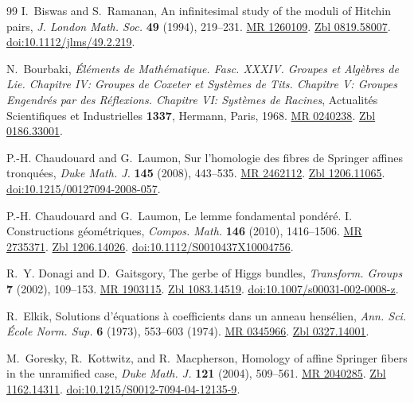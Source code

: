 \documentclass[12pt,a4paper,oneside,english,leqno]{smfart}
\numberwithin{equation}{subsection}
\numberwithin{theo}{subsection}
\theoremstyle{plain}
\theoremstyle{definition}
\theoremstyle{remark}
\begin{document}
\begin{thebibliography}{99}
 I.~Biswas and S.~Ramanan, An infinitesimal study of the moduli of Hitchin pairs, \emph{J. London Math. Soc.} \textbf{49} (1994), 219--231. \href{https://mathscinet.ams.org/mathscinet-getitem?mr=1260109}{MR 1260109}. \href{https://zbmath.org/?q=an:0819.58007}{Zbl 0819.58007}. \href{https://doi.org/10.1112/jlms/49.2.219}{doi:10.1112/jlms/49.2.219}.

 N.~Bourbaki, \emph{\'El\'ements de Math\'ematique. Fasc. XXXIV. Groupes et Alg\`ebres de Lie. Chapitre IV: Groupes de Coxeter et Syst\`emes de Tits. Chapitre V: Groupes Engendr\'es par des R\'eflexions. Chapitre VI: Syst\`emes de Racines}, Actualit\'es Scientifiques et Industrielles \textbf{1337}, Hermann, Paris, 1968. \href{https://mathscinet.ams.org/mathscinet-getitem?mr=0240238}{MR 0240238}. \href{https://zbmath.org/?q=an:0186.33001}{Zbl 0186.33001}.

 P.-H. Chaudouard and G.~Laumon, Sur l'homologie des fibres de Springer affines tronqu\'ees, \emph{Duke Math. J.} \textbf{145} (2008), 443--535. \href{https://mathscinet.ams.org/mathscinet-getitem?mr=2462112}{MR 2462112}. \href{https://zbmath.org/?q=an:1206.11065}{Zbl 1206.11065}. \href{https://doi.org/10.1215/00127094-2008-057}{doi:10.1215/00127094-2008-057}.

 P.-H. Chaudouard and G.~Laumon, Le lemme fondamental pond\'er\'e. I. Constructions g\'eom\'etriques, \emph{Compos. Math.} \textbf{146} (2010), 1416--1506. \href{https://mathscinet.ams.org/mathscinet-getitem?mr=2735371}{MR 2735371}. \href{https://zbmath.org/?q=an:1206.14026}{Zbl 1206.14026}. \href{https://doi.org/10.1112/S0010437X10004756}{doi:10.1112/S0010437X10004756}.

 R.~Y. Donagi and D.~Gaitsgory, The gerbe of Higgs bundles, \emph{Transform. Groups} \textbf{7} (2002), 109--153. \href{https://mathscinet.ams.org/mathscinet-getitem?mr=1903115}{MR 1903115}. \href{https://zbmath.org/?q=an:1083.14519}{Zbl 1083.14519}. \href{https://doi.org/10.1007/s00031-002-0008-z}{doi:10.1007/s00031-002-0008-z}.

 R.~Elkik, Solutions d'\'equations \`a coefficients dans un anneau hens\'elien, \emph{Ann. Sci. \'Ecole Norm. Sup.} \textbf{6} (1973), 553--603 (1974). \href{https://mathscinet.ams.org/mathscinet-getitem?mr=0345966}{MR 0345966}. \href{https://zbmath.org/?q=an:0327.14001}{Zbl 0327.14001}.

 M.~Goresky, R.~Kottwitz, and R.~Macpherson, Homology of affine Springer fibers in the unramified case, \emph{Duke Math. J.} \textbf{121} (2004), 509--561. \href{https://mathscinet.ams.org/mathscinet-getitem?mr=2040285}{MR 2040285}. \href{https://zbmath.org/?q=an:1162.14311}{Zbl 1162.14311}. \href{https://doi.org/10.1215/S0012-7094-04-12135-9}{doi:10.1215/S0012-7094-04-12135-9}.


\end{thebibliography}
\end{document}
